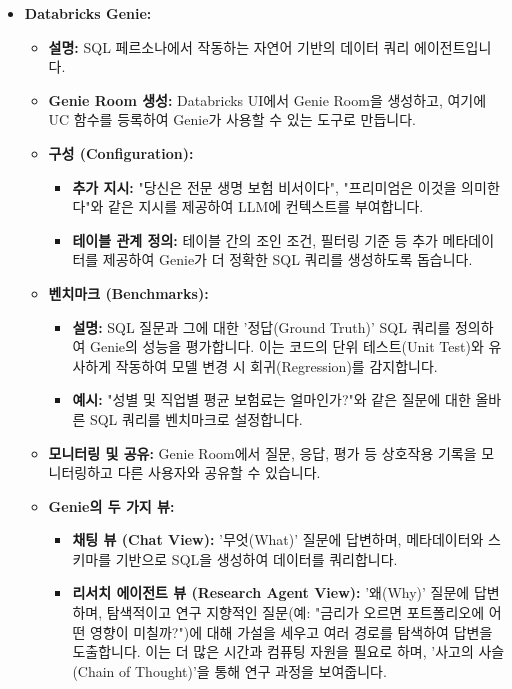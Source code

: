 \documentclass[11pt,a4paper]{article}
\begin{document}
\begin{itemize}
    \item \textbf{Databricks Genie:}
    \begin{itemize}
        \item \textbf{설명:} SQL 페르소나에서 작동하는 자연어 기반의 데이터 쿼리 에이전트입니다.
        \item \textbf{Genie Room 생성:} Databricks UI에서 Genie Room을 생성하고, 여기에 UC 함수를 등록하여 Genie가 사용할 수 있는 도구로 만듭니다.
        \item \textbf{구성 (Configuration):}
        \begin{itemize}
            \item \textbf{추가 지시:} "당신은 전문 생명 보험 비서이다", "프리미엄은 이것을 의미한다"와 같은 지시를 제공하여 LLM에 컨텍스트를 부여합니다.
            \item \textbf{테이블 관계 정의:} 테이블 간의 조인 조건, 필터링 기준 등 추가 메타데이터를 제공하여 Genie가 더 정확한 SQL 쿼리를 생성하도록 돕습니다.
        \end{itemize}
        \item \textbf{벤치마크 (Benchmarks):}
        \begin{itemize}
            \item \textbf{설명:} SQL 질문과 그에 대한 '정답(Ground Truth)' SQL 쿼리를 정의하여 Genie의 성능을 평가합니다. 이는 코드의 단위 테스트(Unit Test)와 유사하게 작동하여 모델 변경 시 회귀(Regression)를 감지합니다.
            \item \textbf{예시:} "성별 및 직업별 평균 보험료는 얼마인가?"와 같은 질문에 대한 올바른 SQL 쿼리를 벤치마크로 설정합니다.
        \end{itemize}
        \item \textbf{모니터링 및 공유:} Genie Room에서 질문, 응답, 평가 등 상호작용 기록을 모니터링하고 다른 사용자와 공유할 수 있습니다.
        \item \textbf{Genie의 두 가지 뷰:}
        \begin{itemize}
            \item \textbf{채팅 뷰 (Chat View):} '무엇(What)' 질문에 답변하며, 메타데이터와 스키마를 기반으로 SQL을 생성하여 데이터를 쿼리합니다.
            \item \textbf{리서치 에이전트 뷰 (Research Agent View):} '왜(Why)' 질문에 답변하며, 탐색적이고 연구 지향적인 질문(예: "금리가 오르면 포트폴리오에 어떤 영향이 미칠까?")에 대해 가설을 세우고 여러 경로를 탐색하여 답변을 도출합니다. 이는 더 많은 시간과 컴퓨팅 자원을 필요로 하며, '사고의 사슬(Chain of Thought)'을 통해 연구 과정을 보여줍니다.
        \end{itemize}
    \end{itemize}
\end{itemize}
\end{document}
